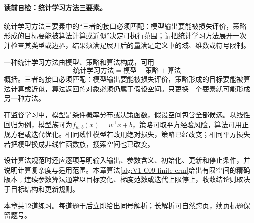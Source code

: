 \paragraph{读前自检：统计学习方法三要素。}统计学习方法三要素中的“三者的接口必须匹配：模型输出要能被损失评价，策略形成的目标要能被算法计算或近似”决定可执行范围；请把$\text{统计学习方法}$展开一次并检查其类型或边界，结果须满足展开后的量满足定义中的域、维数或符号限制。\par

一种统计学习方法由模型、策略和算法构成，可用
\[
\text{统计学习方法}=\text{模型}+\text{策略}+\text{算法}
\]
概括。三者的接口必须匹配：模型输出要能被损失评价，策略形成的目标要能被算法计算或近似，算法返回的对象必须仍属于假设空间。只更换一个要素就可能形成另一种方法。

在监督学习中，模型是条件概率分布或决策函数，假设空间包含全部候选。以线性回归为例，模型族可为$f_{w,b}(x)=w^{\mathsf T}x+b$，策略可取平方经验风险，算法可用正规方程或迭代优化。相同线性模型若改用绝对损失，策略已经改变；相同平方损失若把模型换成非线性函数族，搜索空间也已改变。

设计算法规范时还应逐项写明输入输出、参数含义、初始化、更新和停止条件，并说明计算复杂度与适用范围。本章算法\ref{alg:V1-C09-finite-erm}给出有限空间的精确版本；连续参数算法通常以目标变化、梯度范数或迭代上限停止，收敛结论则取决于目标结构和更新规则。


\begin{chapterexercisebox}
\label{schema:V1-C09:CH-34}
\label{schema:V1-C09:CH-35}
本章共12道练习。每道题干后立即给出同号解析；长解析可自然跨页，续页标题保留题号。
\end{chapterexercisebox}

